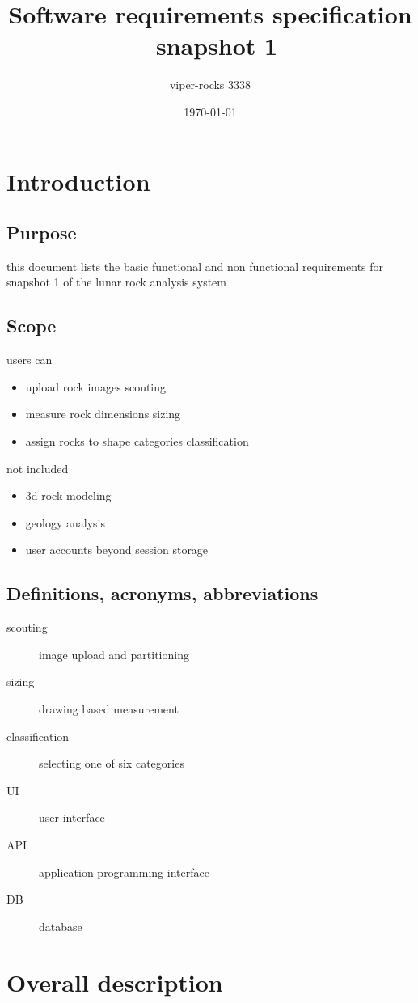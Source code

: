\documentclass{article}
\title{Software requirements specification \ snapshot 1}
\author{viper-rocks 3338}
\date{\today}
\begin{document}
\maketitle

\tableofcontents
\newpage

\section{Introduction}
\subsection{Purpose}
this document lists the basic functional and non functional requirements for snapshot 1 of the lunar rock analysis system

\subsection{Scope}
users can
\begin{itemize}
\item upload rock images scouting
\item measure rock dimensions sizing
\item assign rocks to shape categories classification
\end{itemize}
not included
\begin{itemize}
\item 3d rock modeling
\item geology analysis
\item user accounts beyond session storage
\end{itemize}

\subsection{Definitions, acronyms, abbreviations}
\begin{description}
\item[scouting] image upload and partitioning
\item[sizing] drawing based measurement
\item[classification] selecting one of six categories
\item[UI] user interface
\item[API] application programming interface
\item[DB] database
\end{description}

\section{Overall description}
\end{document}
